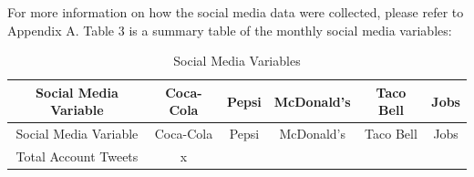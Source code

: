 \documentclass[12pt,oneside]{chicagocapstone}
\begin{document}
For more information on how the social media data were collected, please refer to Appendix A. Table 3 is a summary table of the monthly social media variables:
\begin{longtable}[]{@{}cccccc@{}}
\caption{\label{tab:inher} Social Media Variables}\tabularnewline
\toprule
\begin{minipage}[b]{0.21\columnwidth}\centering
Social Media Variable\strut
\end{minipage} & \begin{minipage}[b]{0.11\columnwidth}\centering
Coca-Cola\strut
\end{minipage} & \begin{minipage}[b]{0.12\columnwidth}\centering
Pepsi\strut
\end{minipage} & \begin{minipage}[b]{0.14\columnwidth}\centering
McDonald's\strut
\end{minipage} & \begin{minipage}[b]{0.14\columnwidth}\centering
Taco Bell\strut
\end{minipage} & \begin{minipage}[b]{0.12\columnwidth}\centering
Jobs\strut
\end{minipage}\tabularnewline
\midrule
\endfirsthead
\toprule
\begin{minipage}[b]{0.21\columnwidth}\centering
Social Media Variable\strut
\end{minipage} & \begin{minipage}[b]{0.11\columnwidth}\centering
Coca-Cola\strut
\end{minipage} & \begin{minipage}[b]{0.12\columnwidth}\centering
Pepsi\strut
\end{minipage} & \begin{minipage}[b]{0.14\columnwidth}\centering
McDonald's\strut
\end{minipage} & \begin{minipage}[b]{0.14\columnwidth}\centering
Taco Bell\strut
\end{minipage} & \begin{minipage}[b]{0.12\columnwidth}\centering
Jobs\strut
\end{minipage}\tabularnewline
\midrule
\endhead
\begin{minipage}[t]{0.21\columnwidth}\centering
Total Account Tweets\strut
\end{minipage} & \begin{minipage}[t]{0.11\columnwidth}\centering
x\strut
\end{minipage} & \begin{minipage}[t]{0.12\columnwidth}\centering

\end{minipage}
\end{longtable}
\end{document}

